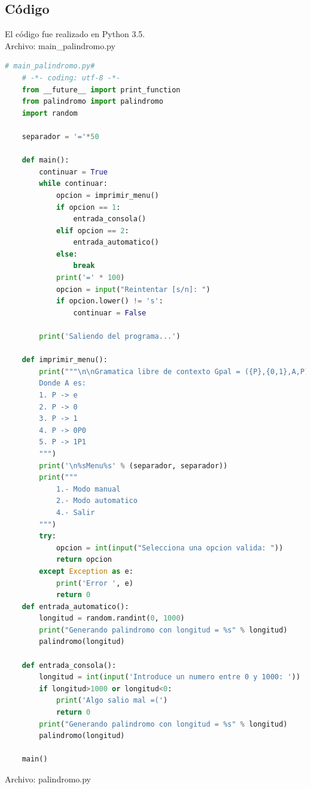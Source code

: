 	\subsection{Código}
	El código fue realizado en Python 3.5.
	\\Archivo: main\_palindromo.py
	\begin{lstlisting}[language=Python]
	# main_palindromo.py#
	# -*- coding: utf-8 -*-
	from __future__ import print_function
	from palindromo import palindromo
	import random

	separador = '='*50

	def main():
	    continuar = True
	    while continuar:
	        opcion = imprimir_menu()
	        if opcion == 1:
	            entrada_consola()
	        elif opcion == 2:
	            entrada_automatico()
	        else:
	            break
	        print('=' * 100)
	        opcion = input("Reintentar [s/n]: ")
	        if opcion.lower() != 's':
	            continuar = False

	    print('Saliendo del programa...')

	def imprimir_menu():
	    print("""\n\nGramatica libre de contexto Gpal = ({P},{0,1},A,P)
	    Donde A es:
	    1. P -> e
	    2. P -> 0
	    3. P -> 1
	    4. P -> 0P0
	    5. P -> 1P1
	    """)
	    print('\n%sMenu%s' % (separador, separador))
	    print("""
	        1.- Modo manual
	        2.- Modo automatico
	        4.- Salir
	    """)
	    try:
	        opcion = int(input("Selecciona una opcion valida: "))
	        return opcion
	    except Exception as e:
	        print('Error ', e)
	        return 0
	def entrada_automatico():
	    longitud = random.randint(0, 1000)
	    print("Generando palindromo con longitud = %s" % longitud)
	    palindromo(longitud)

	def entrada_consola():
	    longitud = int(input('Introduce un numero entre 0 y 1000: '))
	    if longitud>1000 or longitud<0:
	        print('Algo salio mal =(')
	        return 0
	    print("Generando palindromo con longitud = %s" % longitud)
	    palindromo(longitud)

	main()
	\end{lstlisting}
	Archivo: palindromo.py
